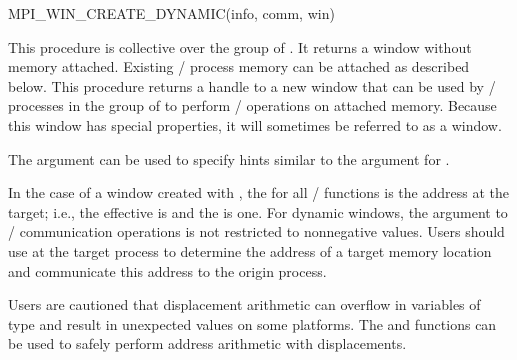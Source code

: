 %
%
\begin{funcdef}{MPI\_WIN\_CREATE\_DYNAMIC}{(\mbox{info}, \mbox{comm}, \mbox{win})}
\end{funcdef}

This procedure is collective over the group of
. It returns a window  without memory attached.
Existing \mpi/ process memory can be attached as described below.
This procedure returns a handle to a new window that can be used by \mpi/ processes in the group of 
to perform \RMA/ operations on attached memory.
Because this window has special properties, it will sometimes be
referred to as a 
window.

The  argument can be used to specify hints
similar to the  argument for .  

In the case of a window created with
, the  for all
\RMA/ functions is the address at the target; i.e., the effective
 is  and the  is one.
For dynamic windows, the 
  argument to \RMA/ communication operations is not restricted to
  nonnegative values.
Users
should use  at the target process to
determine the address of a target memory location and communicate this
address to the origin process.  

\begin{users}
Users are cautioned that displacement arithmetic can overflow in
variables of type  and result in unexpected values on some
platforms.
The  and 
functions can be used to safely perform address arithmetic with 
displacements.
\end{users}

